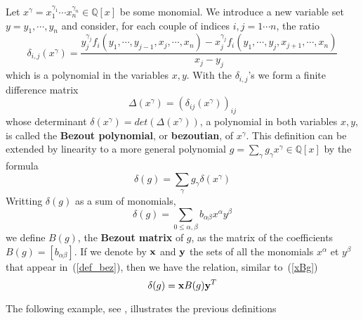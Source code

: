 \documentclass{standalone}
\begin{document}
\begin{defn}
Let $x^\gamma = x_1^{\gamma_1}\cdots x_n^{\gamma_n} \in \mathbb{Q}[x]$ be some monomial.
We introduce a new variable set $y = y_1,\cdots, y_n$ and consider, for each couple of indices $i, j = 1\cdots n$, the ratio
\begin{equation}
\label{finite_diff}
\delta_{i,j}(x^\gamma) = \dfrac{y_j^{\gamma_j}f_i(y_1,\cdots, y_{j-1},x_j,\cdots,x_n) - x_j^{\gamma_j}f_i(y_1,\cdots,y_j,x_{j+1},\cdots,x_n)}{x_j - y_j}
\end{equation}
which is a polynomial in the variables $x, y$. 
With the $\delta_{i,j}$'s we form a finite difference matrix
\begin{equation}
\label{Delta}
\Delta(x^\gamma) = (\delta_{ij}(x^\gamma))_{ij}
\end{equation}
whose determinant $\delta(x^\gamma) = det(\Delta(x^\gamma))$, a polynomial in both variables $x, y$, is called the {\bf Bezout polynomial}, or {\bf bezoutian}, of $x^\gamma$.
This definition can be extended by linearity to a more general polynomial $g = \sum_\gamma g_\gamma x^\gamma \in \mathbb{Q}[x]$ by the formula
$$\delta(g) = \sum_\gamma g_\gamma \delta(x^\gamma)$$
Writting $\delta(g)$ as a sum of monomials, 
\begin{equation}
\label{def_bez}
\delta(g) = \sum_{0 \le \alpha,\beta} b_{\alpha\beta} x^\alpha y^\beta
\end{equation} 
we define $B(g)$, the {\bf Bezout matrix} of $g$, as the matrix of the coefficients $B(g) = [b_{\alpha\beta}]$. If we denote by $\bold{x}$ and $\bold{y}$ the sets of all the monomials $x^\alpha$ et $y^\beta$ that appear in~(\ref{def_bez}), then we have the relation, similar to~(\ref{xBg})
\begin{equation}
	\delta(g) = \bold{x} B(g) \bold{y}^T
\end{equation}
\end{defn}
The following example, see \cite{jpc}, illustrates the previous definitions
\end{document}
